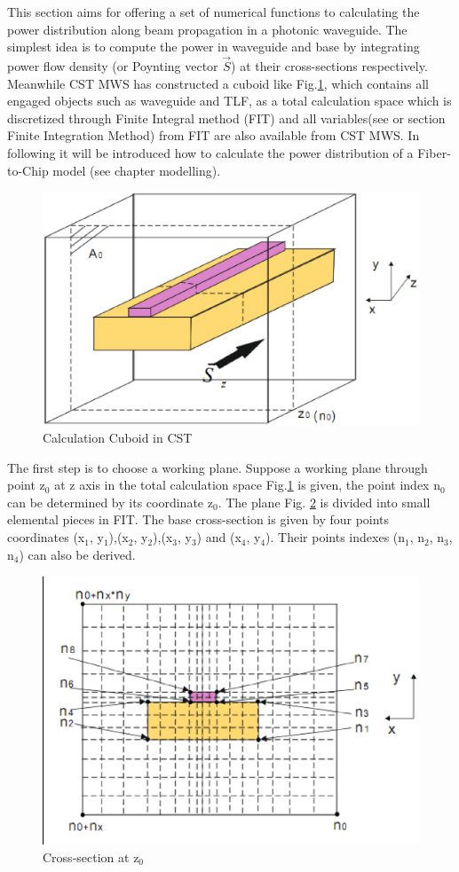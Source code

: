 
This section aims for offering a set of numerical functions to calculating the power distribution along beam propagation in a photonic waveguide. The simplest idea is to compute the power in waveguide and base by integrating power flow density (or Poynting vector $\vec{S}$) at their cross-sections respectively. Meanwhile CST MWS has constructed a cuboid like Fig.\quad\ref{Afig:app_power_distribution01}, which contains all engaged objects such as waveguide and TLF, as a total calculation space which is discretized through Finite Integral method (FIT) and all variables(see \cite{script_FeldSim} or section Finite Integration Method) from FIT are also available from CST MWS. In following it will be introduced how to calculate the power distribution of a Fiber-to-Chip model (see chapter modelling). 
\begin{figure}[ht]
\centering
\includegraphics[width=0.7 \textwidth]{bilder/app_power_distribution01}
\caption{Calculation Cuboid in CST}
\label{Afig:app_power_distribution01}
\end{figure}
The first step is to choose a working plane. Suppose a working plane through point z$_{0}$ at z axis in the total calculation space Fig.\quad\ref{Afig:app_power_distribution01} is given, the point index n$_{0}$ can be determined by its coordinate z$_{0}$. The plane Fig. \quad\ref{Afig:app_power_distribution02}  is divided into small elemental pieces in FIT. The base cross-section is given by four points coordinates (x$_{1}$, y$_{1}$),(x$_{2}$, y$_{2}$),(x$_{3}$, y$_{3}$) and (x$_{4}$, y$_{4}$). Their points indexes (n$_{1}$, n$_{2}$, n$_{3}$, n$_{4}$) can also be derived.    
\begin{figure}[ht]
\centering
\includegraphics[width=0.7 \textwidth]{bilder/app_power_distribution02}
\caption{Cross-section at z$_{0}$}
\label{Afig:app_power_distribution02}
\end{figure}
